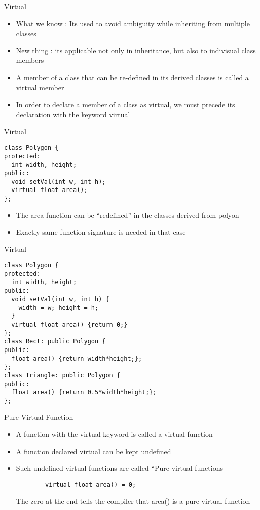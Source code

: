 \documentclass{beamer}
\begin{document}
\begin{frame}[fragile]{Virtual}
  \begin{itemize}
  \item What we know : Its used to avoid ambiguity while inheriting from multiple classes\pause
  \item New thing : its applicable not only in inheritance, but also to indivisual class members\pause
  \item A member of a class that can be re-defined in its derived classes is called a virtual member\pause
  \item In order to declare a member of a class as virtual, we must precede its declaration with the keyword virtual
  \end{itemize}
\end{frame}

\begin{frame}[fragile]{Virtual}
  \begin{lstlisting}
class Polygon {
protected:
  int width, height;
public:
  void setVal(int w, int h);
  virtual float area();
};
  \end{lstlisting}\pause
  \begin{itemize}
    \item The area function can be ``redefined'' in the classes derived from polyon\pause
    \item Exactly same function signature is needed in that case
  \end{itemize}
\end{frame}

\begin{frame}[fragile]{Virtual}
  \begin{lstlisting}
class Polygon {
protected:
  int width, height;
public:
  void setVal(int w, int h) {
    width = w; height = h;
  }
  virtual float area() {return 0;}
};
class Rect: public Polygon {
public:
  float area() {return width*height;};
};
class Triangle: public Polygon {
public:
  float area() {return 0.5*width*height;};
};
  \end{lstlisting}
\end{frame}

\begin{frame}[fragile]{Pure Virtual Function}
  \begin{itemize}
    \item A function with the virtual keyword is called a virtual function\pause
    \item A function declared virtual can be kept undefined\pause
    \item Such undefined virtual functions are called ``Pure virtual functions\pause
      \begin{lstlisting}
        virtual float area() = 0;
      \end{lstlisting}\pause
      The zero at the end tells the compiler that area() is a pure virtual function
  \end{itemize}
\end{frame}
\end{document}
